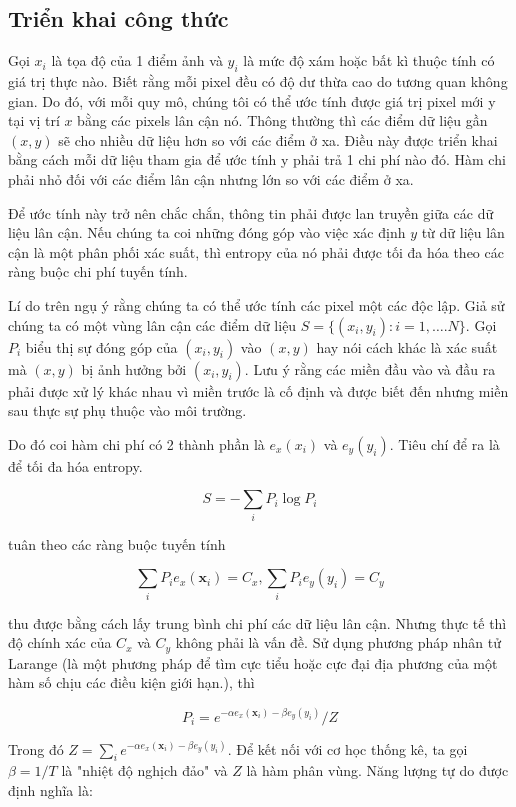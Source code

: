 \documentclass[12pt,letterpaper]{report}
\begin{document}
\subsection{Triển khai công thức}
    
Gọi $x_i$ là tọa độ của 1 điểm ảnh và $y_i$ là mức độ xám hoặc bất kì thuộc tính có giá trị thực nào. Biết rằng mỗi pixel đều có độ dư thừa cao do tương quan không gian. Do đó, với mỗi quy mô, chúng tôi có thể ước tính được giá trị pixel mới y tại vị trí $x$ bằng các pixels lân cận nó. Thông thường thì các điểm dữ liệu gần $(x,y)$ sẽ cho nhiều dữ liệu hơn so với các điểm ở xa. Điều này được triển khai bằng cách mỗi dữ liệu tham gia để ước tính y phải trả 1 chi phí nào đó. Hàm chi phải nhỏ đối với các điểm lân cận nhưng lớn so với các điểm ở xa.
    
Để ước tính này trở nên chắc chắn, thông tin phải được lan truyền giữa các dữ liệu lân cận. Nếu chúng ta coi những đóng góp vào việc xác định $y$ từ dữ liệu lân cận là một phân phối xác suất, thì entropy của nó phải được tối đa hóa theo các ràng buộc chi phí tuyến tính.
    
    
Lí do trên ngụ ý rằng chúng ta có thể ước tính các pixel một các độc lập.  Giả sử chúng ta có một vùng lân cận các điểm dữ liệu $S = \{(x_i, y_i): i = 1,….N\}$. Gọi $P_i$  biểu thị sự đóng góp của $(x_i,y_i)$ vào $(x,y)$ hay nói cách khác là xác suất mà $(x,y)$ bị ảnh hưởng bởi $(x_i,y_i)$. Lưu ý rằng các miền đầu vào và đầu ra phải được xử lý khác nhau vì miền trước là cố định và được biết đến nhưng miền sau thực sự phụ thuộc vào môi trường.
    
Do đó coi hàm chi phí có 2 thành phần là $e_x(x_i)$ và $e_y(y_i)$. Tiêu chí để ra là để tối đa hóa entropy.
    
$$S = -\sum_i P_i \log P_i$$
    
tuân theo các ràng buộc tuyến tính
    
$$\sum_i P_ie_x(\mathbf x_i) = C_x, \sum_i P_ie_y(y_i) = C_y$$
    
thu được bằng cách lấy trung bình chi phí các dữ liệu lân cận. Nhưng thực tế thì độ chính xác của $C_x$ và $C_y$ không phải là vấn đề. Sử dụng phương pháp nhân tử Larange (là một phương pháp để tìm cực tiểu hoặc cực đại địa phương của một hàm số chịu các điều kiện giới hạn.), thì

$$P_i = e^{-\alpha e_x(\mathbf x_i)-\beta e_y(y_i)}/Z$$

Trong đó $Z = \sum_i e^{-\alpha e_x (\mathbf x _i)-\beta e_y(y_i)}$. Để kết nối với cơ học thống kê, ta gọi $\beta = 1/T$ là "nhiệt độ nghịch đảo" và $Z$ là hàm phân vùng. Năng lượng tự do được định nghĩa là:
\end{document}
